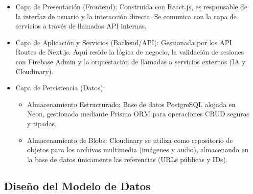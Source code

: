 \begin{itemize}
    \item Capa de Presentación (Frontend): Construida con React.js, es responsable de la interfaz de usuario y la interacción directa. Se comunica con la capa de servicios a través de llamadas API internas.
    \item Capa de Aplicación y Servicios (Backend/API): Gestionada por los API Routes de Next.js. Aquí reside la lógica de negocio, la validación de sesiones con Firebase Admin y la orquestación de llamadas a servicios externos (IA y Cloudinary).
    \item Capa de Persistencia (Datos):
        \begin{itemize}
           \item Almacenamiento Estructurado: Base de datos PostgreSQL alojada en Neon, gestionada mediante Prisma ORM para operaciones CRUD seguras y tipadas.
           \item Almacenamiento de Blobs: Cloudinary se utiliza como repositorio de objetos para los archivos multimedia (imágenes y audio), almacenando en la base de datos únicamente las referencias (URLs públicas y IDs).
        \end{itemize}
\end{itemize}

\begin{figure}[H]
    \centering
    {}
\end{figure}

\subsection{Diseño del Modelo de Datos}

